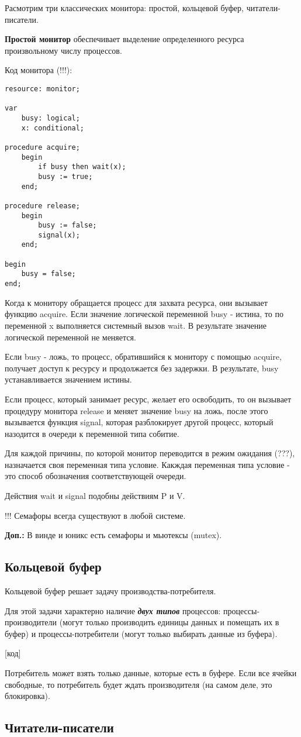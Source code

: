 \documentclass[a4paper, 14pt]{report}
\begin{document}
	Расмотрим три классических монитора: простой, кольцевой буфер, читатели-писатели.
	
	\textbf{Простой монитор} обеспечивает выделение определенного ресурса произвольному числу процессов.
	
	Код монитора (!!!):
	
	\begin{lstlisting}
resource: monitor;

var
	busy: logical;
	x: conditional;

procedure acquire;
	begin
		if busy then wait(x);
		busy := true;
	end;

procedure release;
	begin
		busy := false;
		signal(x);
	end;

begin
	busy = false;
end;
	\end{lstlisting}

	Когда к монитору обращается процесс для захвата ресурса, они вызывает функцию acquire. Если значение логической переменной busy - истина, то по переменной x выполняется системный вызов wait. В результате значение логической переменной не меняется.
	
	Если busy - ложь, то процесс, обратившийся к монитору с помощью acquire, получает доступ к ресурсу и продолжается без задержки. В результате, busy устанавливается значением истины. 
	
	Если процесс, который занимает ресурс, желает его освободить, то он вызывает процедуру монитора release и меняет значение busy на ложь, после этого вызывается функция signal, которая разблокирует другой процесс, который назодится в очереди к переменной типа собитие.
	
	Для каждой причины, по которой монитор переводится в режим ожидания (???), назначается своя переменная типа условие. Какждая переменная типа условие - это способ обозначения соответствующей очереди.
	
	Действия wait и signal подобны действиям P и V.
	
	!!! Семафоры всегда существуют в любой системе.
	
	\textbf{Доп.:} В винде и юникс есть семафоры и мьютексы (mutex).
	
	\subsection*{Кольцевой буфер}
	
	Кольцевой буфер решает задачу производства-потребителя.
	
	Для этой задачи характерно наличие \textbf{\textit{двух типов}} процессов: процессы-производители (могут только производить единицы данных и помещать их в буфер) и процессы-потребители (могут только выбирать данные из буфера).
	
	[код]
	
	Потребитель может взять только данные, которые есть в буфере. Если все ячейки свободные, то потребитель будет ждать производителя (на самом деле, это блокировка).
	
	\subsection*{Читатели-писатели}
\end{document}
